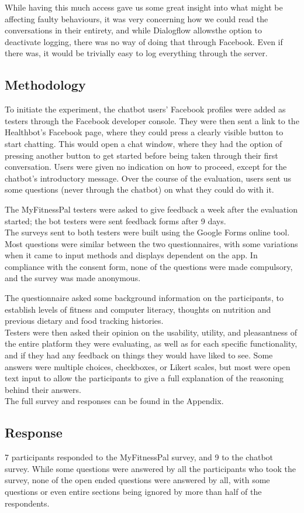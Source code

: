 While having this much access gave us some great insight into what might be affecting faulty behaviours, it was very concerning how we could read the conversations in their entirety, and while Dialogflow allowsthe option to deactivate logging, there was no way of doing that through Facebook. Even if there was, it would be trivially easy to log everything through the server.
\subsection{Methodology}
To initiate the experiment, the chatbot users' Facebook profiles were added as testers through the Facebook developer console. They were then sent a link to the Healthbot's Facebook page, where they could press a clearly visible button to start chatting. This would open a chat window, where they had the option of pressing another button to get started before being taken through their first conversation. Users were given no indication on how to proceed, except for the chatbot's introductory message. Over the course of the evaluation, users sent us some questions (never through the chatbot) on what they could do with it. 

The MyFitnessPal testers were asked to give feedback a week after the evaluation started; the bot testers were sent feedback forms after 9 days.\\
The surveys sent to both testers were built using the Google Forms online tool. Most questions were similar between the two questionnaires, with some variations when it came to input methods and displays dependent on the app. In compliance with the consent form, none of the questions were made compulsory, and the survey was made anonymous.

The questionnaire asked some background information on the participants, to establish levels of fitness and computer literacy, thoughts on nutrition and previous dietary and food tracking histories.\\
Testers were then asked their opinion on the usability, utility, and pleasantness of the entire platform they were evaluating, as well as for each specific functionality, and if they had any feedback on things they would have liked to see. Some answers were multiple choices, checkboxes, or Likert scales, but most were open text input to allow the participants to give a full explanation of the reasoning behind their answers.\\
The full survey and responses can be found in the Appendix.
\subsection{Response}
7 participants responded to the MyFitnessPal survey, and 9 to the chatbot survey. While some questions were answered by all the participants who took the survey, none of the open ended questions were answered by all, with some questions or even entire sections being ignored by more than half of the respondents. 

